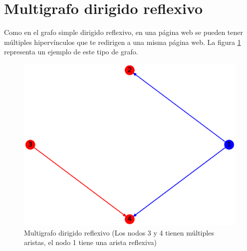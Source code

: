 \documentclass{article}
\begin{document}
\section{Multigrafo dirigido reflexivo}
Como en el grafo simple dirigido reflexivo, en una página web se pueden tener múltiples hipervínculos que te redirigen a una misma página web. La figura \ref{fig:MDR} representa un ejemplo de este tipo de grafo.
\begin{figure}[H]
    \includegraphics[width=\textwidth]{12-MDR}
    \caption{Multigrafo dirigido reflexivo (Los nodos 3 y 4 tienen múltiples aristas, el nodo 1 tiene una arista reflexiva)}
    \label{fig:MDR}
\end{figure}









\end{document}
